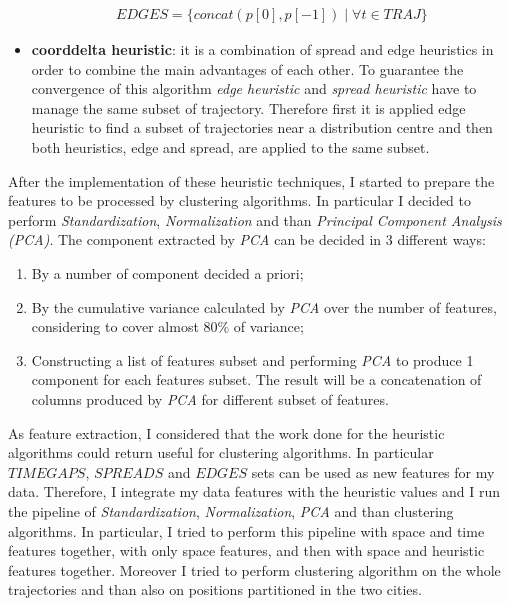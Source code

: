 \begin{itemize}
	\begin{align}
		EDGES = \{concat(p[0], p[-1]) \mid \forall t \in TRAJ \}
	\end{align}
 	\item \textbf{coorddelta heuristic}: it is a combination of spread and edge heuristics in order to combine the main advantages of each other. To guarantee the convergence of this algorithm \textit{edge heuristic} and \textit{spread heuristic} have to manage the same subset of trajectory. Therefore first it is applied edge heuristic to find a subset of trajectories near a distribution centre and then both heuristics, edge and spread, are applied to the same subset.
\end{itemize}

After the implementation of these heuristic techniques, I started to prepare the features to be processed by clustering algorithms. In particular I decided to perform \textit{Standardization}, \textit{Normalization} and than \textit{Principal Component Analysis (PCA)}. The component extracted by \textit{PCA} can be decided in 3 different ways:
\begin{enumerate}
	\item By a number of component decided a priori;
	\item By the cumulative variance calculated by \textit{PCA} over the number of features, considering to cover almost $80\%$ of variance;
	\item Constructing a list of features subset and performing \textit{PCA} to produce 1 component for each features subset. The result will be a concatenation of columns produced by \textit{PCA} for different subset of features.
\end{enumerate}

As feature extraction, I considered that the work done for the heuristic algorithms could return useful for clustering algorithms. In particular $TIMEGAPS$, $SPREADS$ and $EDGES$ sets can be used as new features for my data. Therefore, I integrate my data features with the heuristic values and I run the pipeline of \textit{Standardization}, \textit{Normalization}, \textit{PCA} and than clustering algorithms. In particular, I tried to perform this pipeline with space and time features together, with only space features, and then with space and heuristic features together. Moreover I tried to perform clustering algorithm on the whole trajectories and than also on positions partitioned in the two cities.


